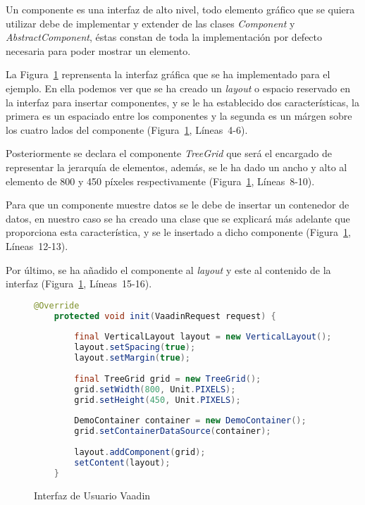 Un componente es una interfaz de alto nivel, todo elemento gráfico que se quiera utilizar debe de implementar y extender de las clases \emph{Component}\cite{componentVaadin} y \emph{AbstractComponent}\cite{abstractComponentVaadin}, éstas constan de toda la implementación por defecto necesaria para poder mostrar un elemento.

La Figura~\ref{fig:uiVaadin} reprensenta la interfaz gráfica que se ha implementado para el ejemplo. En ella podemos ver que se ha creado un \emph{layout} o espacio reservado en la interfaz para insertar componentes, y se le ha establecido dos características, la primera es un espaciado entre los componentes y la segunda es un márgen sobre los cuatro lados del componente (Figura~\ref{fig:uiVaadin}, Líneas~4-6).

Posteriormente se declara el componente \emph{TreeGrid} que será el encargado de representar la jerarquía de elementos, además, se le ha dado un ancho y alto al elemento de 800 y 450 píxeles respectivamente (Figura~\ref{fig:uiVaadin}, Líneas~8-10).

Para que un componente muestre datos se le debe de insertar un contenedor de datos, en nuestro caso se ha creado una clase que se explicará más adelante que proporciona esta característica, y se le insertado a dicho componente (Figura~\ref{fig:uiVaadin}, Líneas~12-13).

Por último, se ha añadido el componente al \emph{layout} y este al contenido de la interfaz (Figura~\ref{fig:uiVaadin}, Líneas~15-16).

\begin{figure}[!tb]
	\centering
	\begin{lstlisting}[language=Java]
	@Override
	protected void init(VaadinRequest request) {
	
		final VerticalLayout layout = new VerticalLayout();
		layout.setSpacing(true);
		layout.setMargin(true);
		
		final TreeGrid grid = new TreeGrid();
		grid.setWidth(800, Unit.PIXELS);
		grid.setHeight(450, Unit.PIXELS);
		
		DemoContainer container = new DemoContainer();
		grid.setContainerDataSource(container);
		
		layout.addComponent(grid);
		setContent(layout);
	}
	\end{lstlisting}
	\caption{Interfaz de Usuario Vaadin}
	\label{fig:uiVaadin}
\end{figure}

